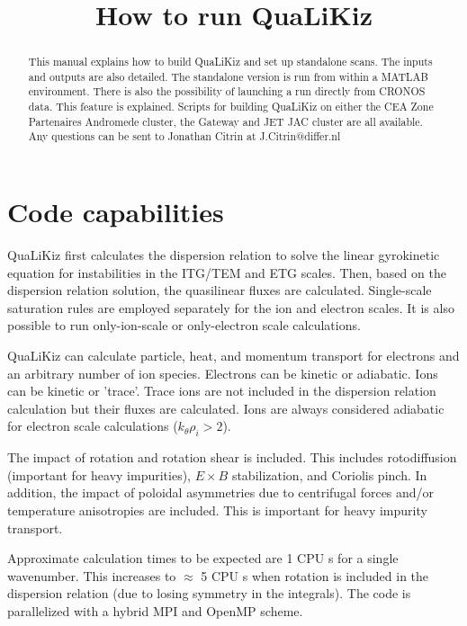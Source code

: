\documentclass{article}
\begin{document}
\title{How to run QuaLiKiz}

\maketitle

\begin{abstract}
This manual explains how to build QuaLiKiz and set up standalone scans. The inputs and outputs are also detailed. The standalone version is run from within a MATLAB environment. There is also the possibility of launching a run directly from CRONOS data. This feature is explained. Scripts for building QuaLiKiz on either the CEA Zone Partenaires Andromede cluster, the Gateway and JET JAC cluster are all available. Any questions can be sent to Jonathan Citrin at J.Citrin@differ.nl
\end{abstract}

\section{Code capabilities}
QuaLiKiz first calculates the dispersion relation to solve the linear gyrokinetic equation for instabilities in the ITG/TEM and ETG scales. Then, based on the dispersion relation solution, the quasilinear fluxes are calculated. Single-scale saturation rules are employed separately for the ion and electron scales. It is also possible to run only-ion-scale or only-electron scale calculations.

QuaLiKiz can calculate particle, heat, and momentum transport for electrons and an arbitrary number of ion species. Electrons can be kinetic or adiabatic. Ions can be kinetic or 'trace'. Trace ions are not included in the dispersion relation calculation but their fluxes are calculated. Ions are always considered adiabatic for electron scale calculations ($k_\theta\rho_i>2$). 

The impact of rotation and rotation shear is included. This includes rotodiffusion (important for heavy impurities), $E{\times}B$ stabilization, and Coriolis pinch. In addition, the impact of poloidal asymmetries due to centrifugal forces and/or temperature anisotropies are included. This is important for heavy impurity transport.

Approximate calculation times to be expected are 1 CPU s for a single wavenumber. This increases to $\approx$ 5 CPU s when rotation is included in the dispersion relation (due to losing symmetry in the integrals). The code is parallelized with a hybrid MPI and OpenMP scheme. 
\end{document}
